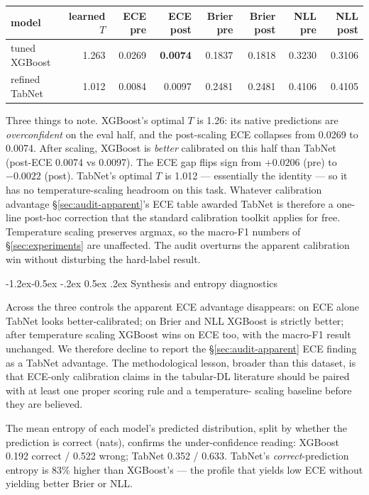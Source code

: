 \documentclass[11pt]{article}
\makeatletter
\renewcommand\subsection{\@startsection{subsection}{2}{\z@}%
  {-1.2ex\@plus -0.5ex \@minus -.2ex}%
  {0.5ex \@plus .2ex}%
  {\normalfont\normalsize\bfseries}}
\newcommand{\mF}{macro-F1}
\makeatother
\begin{document}
\begin{center}
\scriptsize
\begin{tabular}{lrrrrrrr}
\toprule
model & learned $T$ & ECE pre & ECE post & Brier pre & Brier post & NLL pre & NLL post \\
\midrule
tuned XGBoost  & 1.263 & 0.0269 & \textbf{0.0074} & 0.1837 & 0.1818 & 0.3230 & 0.3106 \\
refined TabNet & 1.012 & 0.0084 & 0.0097          & 0.2481 & 0.2481 & 0.4106 & 0.4105 \\
\bottomrule
\end{tabular}
\end{center}

Three things to note. XGBoost's optimal $T$ is 1.26: its native
predictions are \emph{overconfident} on the eval half, and the
post-scaling ECE collapses from 0.0269 to 0.0074. After scaling,
XGBoost is \emph{better} calibrated on this half than TabNet
(post-ECE 0.0074 vs 0.0097). The ECE gap flips sign from $+0.0206$
(pre) to $-0.0022$ (post). TabNet's optimal $T$ is 1.012 ---
essentially the identity --- so it has no temperature-scaling
headroom on this task. Whatever calibration advantage
\S\ref{sec:audit-apparent}'s ECE table awarded TabNet is therefore a
one-line post-hoc correction that the standard calibration toolkit
applies for free. Temperature scaling preserves argmax, so the
\mF{} numbers of \S\ref{sec:experiments} are unaffected. The audit
overturns the apparent calibration win without disturbing the
hard-label result.

\subsection{Synthesis and entropy diagnostics}\label{sec:audit-entropy}

Across the three controls the apparent ECE advantage disappears: on
ECE alone TabNet looks better-calibrated; on Brier and NLL XGBoost
is strictly better; after temperature scaling XGBoost wins on ECE
too, with the \mF{} result unchanged. We therefore decline to report
the \S\ref{sec:audit-apparent} ECE finding as a TabNet advantage.
The methodological lesson, broader than this dataset, is that
ECE-only calibration claims in the tabular-DL literature should be
paired with at least one proper scoring rule and a temperature-
scaling baseline before they are believed.

The mean entropy of each model's predicted distribution, split by
whether the prediction is correct (nats), confirms the
under-confidence reading: XGBoost 0.192 correct / 0.522 wrong;
TabNet 0.352 / 0.633. TabNet's \emph{correct}-prediction entropy is
83\% higher than XGBoost's --- the profile that yields low ECE
without yielding better Brier or NLL.
\end{document}
